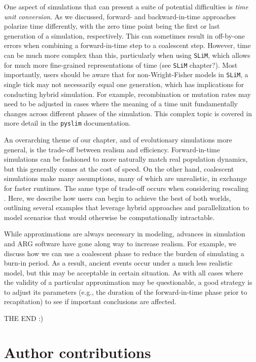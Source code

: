 \documentclass[12pt]{article}
\newcommand{\slim}[0]{\texttt{SLiM}\xspace}
\newcommand{\pyslim}[0]{\texttt{pyslim}\xspace}
\begin{document}
One aspect of simulations that can present a suite of potential difficulties is \emph{time unit conversion}. As we discussed, forward- and backward-in-time approaches polarize time
differently, with the zero time point being the first or last generation of a simulation, respectively. This can sometimes result in off-by-one errors when combining a forward-in-time
step to a coalescent step. However, time can be much more complex than this, particularly when using \slim, which allows for much more fine-grained representations of time
(see \slim chapter?). Most importantly, users should be aware that for non-Wright-Fisher models in \slim, a single tick may not necessarily equal one generation, which has
implications for conducting hybrid simulation. For example, recombination or mutation rates may need to be adjusted in cases where the meaning of a time unit fundamentally
changes across different phases of the simulation. This complex topic is covered in more detail in the \pyslim documentation.

An overarching theme of our chapter, and of evolutionary simulations more general, is the trade-off between realism and efficiency. Forward-in-time simulations can be fashioned to
more naturally match real population dynamics, but this generally comes at the cost of speed. On the other hand, coalescent simulations make many assumptions, many of which
are unrealistic, in exchange for faster runtimes. The same type of trade-off occurs when considering rescaling \citep{cury_simulation_2022,dabi_population_2025}. Here, we describe
how users can begin to achieve the best of both worlds, outlining several examples that leverage hybrid approaches and parallelization to model scenarios that would otherwise be
computationally intractable.

While approximations are always necessary in modeling, advances in simulation and ARG software have gone along way to increase realism. For example, we discuss how we
can use a coalescent phase to reduce the burden of simulating a burn-in period. As a result, ancient events occur under a much less realistic model, but this may be acceptable in
certain situation. As with all cases where the validity of a particular approximation may be questionable, a good strategy is to adjust its parameters (e.g., the duration of the
forward-in-time phase prior to recapitation) to see if important conclusions are affected.






THE END :)

\section*{Author contributions}




\newpage
\appendix
\end{document}
